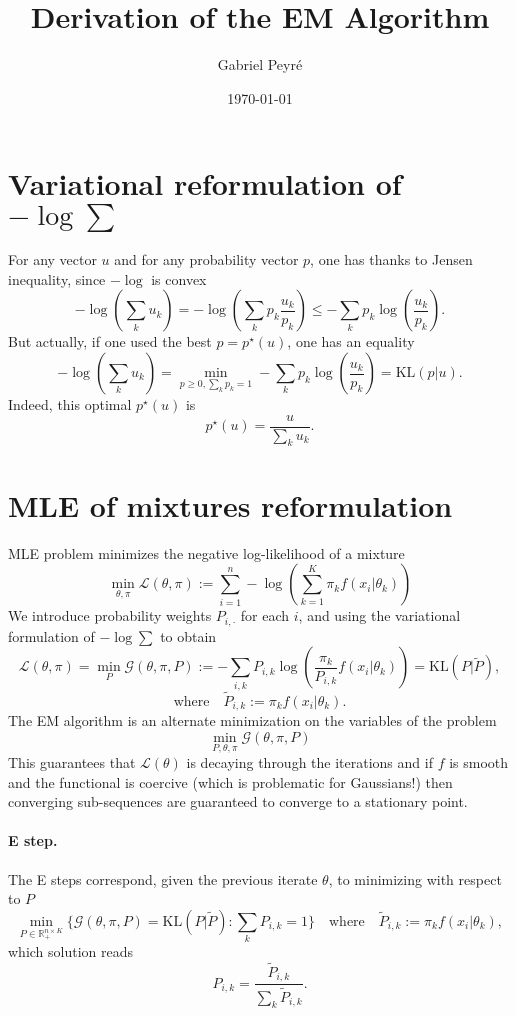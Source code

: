 \documentclass{article}
\author{Gabriel Peyré}
\date{\today}
\title{Derivation of the EM Algorithm}
\begin{document}
\maketitle

\section{Variational reformulation of $-\log \sum$}

For any vector $u$ and for any probability vector $p$, one has thanks to Jensen inequality, since $-\log$ is convex
$$
	-\log(\sum_k u_k) = -\log(\sum_k p_k \frac{u_k}{p_k})  \leq - \sum_k p_k \log(\frac{u_k}{p_k}).
$$
But actually, if one used the best $p=p^\star(u)$, one has an equality 
$$
	-\log(\sum_k u_k) = \min_{p\geq 0, \sum_k p_k=1}  - \sum_k p_k \log(\frac{u_k}{p_k}) = \text{KL}(p|u).
$$
Indeed, this optimal $p^\star(u)$ is
$$
	p^\star(u) = \frac{u}{\sum_k u_k}.
$$

\section{MLE of mixtures reformulation}

MLE problem minimizes the negative log-likelihood of a mixture 
\begin{equation}
    \min_{\theta,\pi} \mathcal{L}(\theta,\pi) := \sum_{i=1}^n -\log \left( \sum_{k=1}^K \pi_k f(x_i|\theta_k) \right)
\end{equation}
We introduce probability weights $P_{i,\cdot}$ for each $i$, and using the variational formulation of $-\log \sum$ to obtain
$$
	\mathcal{L}(\theta,\pi) = \min_{P} \mathcal{G}(\theta,\pi,P) := - \sum_{i,k} P_{i,k} \log\left( \frac{\pi_k}{P_{i,k}}f(x_i|\theta_k)  \right)
	 = \text{KL}(P|\tilde P), 
$$
$$
	 \text{where}\quad
	 \tilde P_{i,k} := \pi_k f(x_i|\theta_k).
$$
The EM algorithm is an alternate minimization on the variables of the problem
$$
	\min_{P,\theta,\pi} \mathcal{G}(\theta,\pi,P) 
$$
This guarantees that $\mathcal{L}(\theta)$ is decaying through the iterations and if $f$ is smooth and the functional is coercive (which is problematic for Gaussians!) then converging sub-sequences are guaranteed to converge to a stationary point. 

\paragraph{E step.}

The E steps correspond, given the previous iterate $\theta$, to minimizing with respect to $P$ 
$$
	\min_{ P \in \mathbb{R}^{n \times K}_+ } \{ \mathcal{G}(\theta,\pi,P)  = \text{KL}(P|\tilde P) : \sum_k P_{i,k} = 1\}
	\quad\text{where}\quad
	\tilde P_{i,k} := \pi_k f(x_i|\theta_k),
$$
which solution reads
$$
	P_{i,k} = \frac{\tilde P_{i,k}}{ \sum_k \tilde P_{i,k} }.
$$
\end{document}
